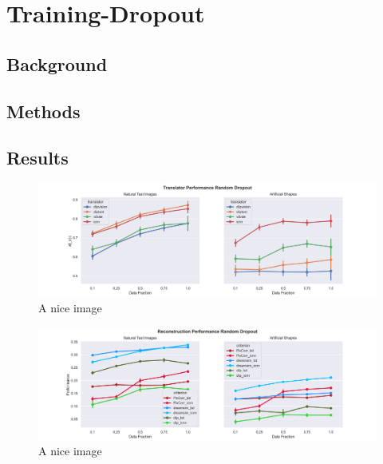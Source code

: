 \section{Training-Dropout}
\subsection{Background}
\subsection{Methods}
\subsection{Results}



\begin{figure}[ht]
    \centering
    \includegraphics[width=1\textwidth]{plots/dropout_random_translator.png}
    \caption{A nice image}\label{fig:dropout_random_translator}
\end{figure}

\begin{figure}[ht]
    \centering
    \includegraphics[width=1\textwidth]{plots/dropout_random_reconstruction.png}
    \caption{A nice image}\label{fig:dropout_random_reconstruction_test}
\end{figure}



